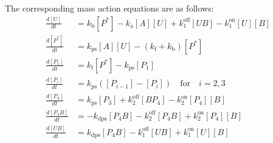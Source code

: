 \documentclass[a4paper,10pt]{article}
\numberwithin{equation}{section}
\begin{document}

                                                                                               
The corresponding mass action equations are as follows:
\begin{align*}
\frac{d[U]}{dt}&=k_{\mathrm b}[P^{*}]-k_{\mathrm{a}} [A][U]+k_{1}^{\mathrm{off}}[UB] -k_{1}^{\mathrm{on}}[U][B] \\
\frac{d[P^{*}]}{dt}&=k_{\mathrm{ps}} [A][U]-(k_{\mathrm f}+k_{\mathrm b})[P^{*}]\\
\frac{d[P_{1}]}{dt}&=k_{\mathrm f}[P^{*}]-k_{\mathrm{ps}}[P_{1}]\\
\frac{d[P_{i}]}{dt}&=k_{\mathrm{ps}}([P_{i-1}]-[P_{i}]) \quad \mathrm{for} \quad i=2,3\\
\frac{d[P_{4}]}{dt}&=k_{\mathrm{ps}}[P_{3}]+k_{2}^{\mathrm{off}}[BP_{4}] -k_{2}^{\mathrm{on}}[P_{4}][B] \\
\frac{d[P_{4}B]}{dt}&=-k_{\mathrm{dps}}[P_{4}B]-k_{2}^{\mathrm{off}}[P_{4}B] +k_{2}^{\mathrm{on}}[P_{4}][B]\\
\frac{d[UB]}{dt}&=k_{\mathrm{dps}}[P_{4}B]-k_{1}^{\mathrm{off}}[UB] +k_{1}^{\mathrm{on}}[U][B]
\end{align*}

\end{document}
